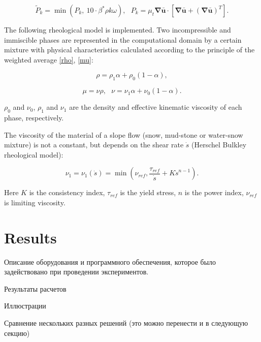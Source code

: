 \documentclass[sensors,article,submit,moreauthors,pdftex]{Definitions/mdpi}
\begin{document}
\begin{paracol}{2}
\begin{equation}
	\widetilde{P}_k = \min (P_k,\ 10 \cdot \beta^* \rho k \omega),\ \ \ P_k = \mu_t \boldsymbol{\nabla} \bar{\boldsymbol{u}} \cdot \left[ \boldsymbol{\nabla} \bar{\boldsymbol{u}} + (\boldsymbol{\nabla} \bar{\boldsymbol{u}})^T\right].
\end{equation}
 
The following rheological model is implemented. Two incompressible and immiscible phases are represented in the computational domain by a certain mixture with physical characteristics calculated according to the principle of the weighted average \eqref{rho}, \eqref{mu}:

\begin{equation}
	\label{rho}
	\rho = \rho_1 \alpha + \rho_0 (1 - \alpha),
\end{equation}

\begin{equation}
	\label{mu}
	\mu = \nu \rho,\ \ \ \nu = \nu_1 \alpha + \nu_0 (1 - \alpha).
\end{equation}

$\rho_0$ and $\nu_0$, $\rho_1$ and $\nu_1$ are the density and effective kinematic viscosity of each phase, respectively.

The viscosity of the material of a slope flow (snow, mud-stone or water-snow mixture) is not a constant, but depends on the shear rate $\dot{s}$ (Herschel Bulkley rheological model):

\begin{equation}
	\label{muHB}
	\nu_1 = \nu_1 (\dot{s}) = \min (\nu_{ref}, \frac{\tau_{ref}}{\dot{s}} + K\dot{s}^{n-1}).
\end{equation}

Here $K$ is the consistency index, $\tau_{ref}$ is the yield stress, $n$ is the power index, $\nu_{ref}$ is limiting viscosity.

\section{Results}

Описание оборудования и программного обеспечения, которое было задействовано при проведении экспериментов.

Результаты расчетов

Иллюстрации

Сравнение нескольких разных решений (это можно перенести и в следующую секцию)


\end{paracol}
\end{document}
